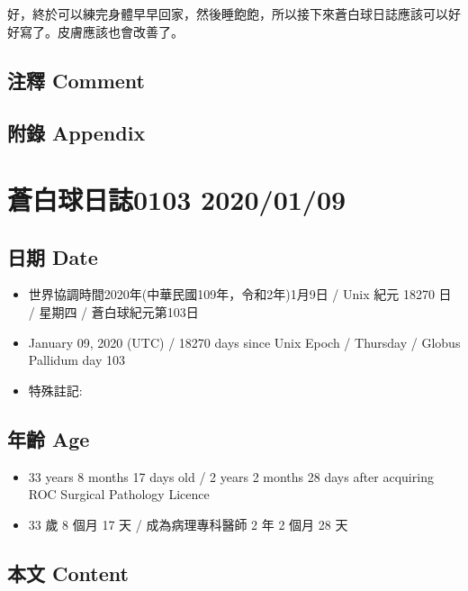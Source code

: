 \documentclass[
]{article}
\providecommand{\tightlist}{%
  \setlength{\itemsep}{0pt}\setlength{\parskip}{0pt}}
\begin{document}
好，終於可以練完身體早早回家，然後睡飽飽，所以接下來蒼白球日誌應該可以好好寫了。皮膚應該也會改善了。

\hypertarget{ux6ce8ux91cb-comment-37}{%
\subsection{注釋 Comment}\label{ux6ce8ux91cb-comment-37}}

\hypertarget{ux9644ux9304-appendix-38}{%
\subsection{附錄 Appendix}\label{ux9644ux9304-appendix-38}}

\hypertarget{ux84bcux767dux7403ux65e5ux8a8c0103-20200109}{%
\section{蒼白球日誌0103
2020/01/09}\label{ux84bcux767dux7403ux65e5ux8a8c0103-20200109}}

\hypertarget{ux65e5ux671f-date-39}{%
\subsection{日期 Date}\label{ux65e5ux671f-date-39}}

\begin{itemize}
\tightlist
\item
  世界協調時間2020年(中華民國109年，令和2年)1月9日 / Unix 紀元 18270 日
  / 星期四 / 蒼白球紀元第103日
\item
  January 09, 2020 (UTC) / 18270 days since Unix Epoch / Thursday /
  Globus Pallidum day 103
\item
  特殊註記:
\end{itemize}

\hypertarget{ux5e74ux9f61-age-39}{%
\subsection{年齡 Age}\label{ux5e74ux9f61-age-39}}

\begin{itemize}
\tightlist
\item
  33 years 8 months 17 days old / 2 years 2 months 28 days after
  acquiring ROC Surgical Pathology Licence
\item
  33 歲 8 個月 17 天 / 成為病理專科醫師 2 年 2 個月 28 天
\end{itemize}

\hypertarget{ux672cux6587-content-39}{%
\subsection{本文 Content}\label{ux672cux6587-content-39}}
\end{document}
